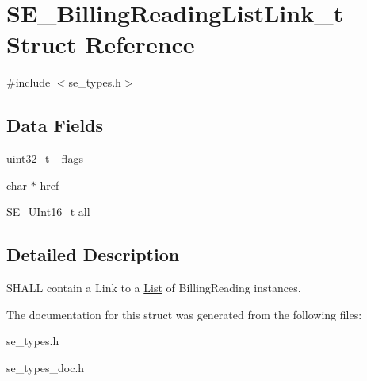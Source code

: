 \hypertarget{structSE__BillingReadingListLink__t}{}\section{S\+E\+\_\+\+Billing\+Reading\+List\+Link\+\_\+t Struct Reference}
\label{structSE__BillingReadingListLink__t}


{\ttfamily \#include $<$se\+\_\+types.\+h$>$}

\subsection*{Data Fields}
\begin{DoxyCompactItemize}
\item 
uint32\+\_\+t \hyperlink{group__BillingReadingListLink_ga37c4ee430c1db09cacc70d0bbde77104}{\+\_\+flags}
\item 
char $\ast$ \hyperlink{group__BillingReadingListLink_ga20c5e48e638d31cf9928d4804385b494}{href}
\item 
\hyperlink{group__UInt16_gac68d541f189538bfd30cfaa712d20d29}{S\+E\+\_\+\+U\+Int16\+\_\+t} \hyperlink{group__BillingReadingListLink_ga7785907289146a2a194d95384465e1d9}{all}
\end{DoxyCompactItemize}


\subsection{Detailed Description}
S\+H\+A\+LL contain a Link to a \hyperlink{structList}{List} of Billing\+Reading instances. 

The documentation for this struct was generated from the following files\+:\begin{DoxyCompactItemize}
\item 
se\+\_\+types.\+h\item 
se\+\_\+types\+\_\+doc.\+h\end{DoxyCompactItemize}

